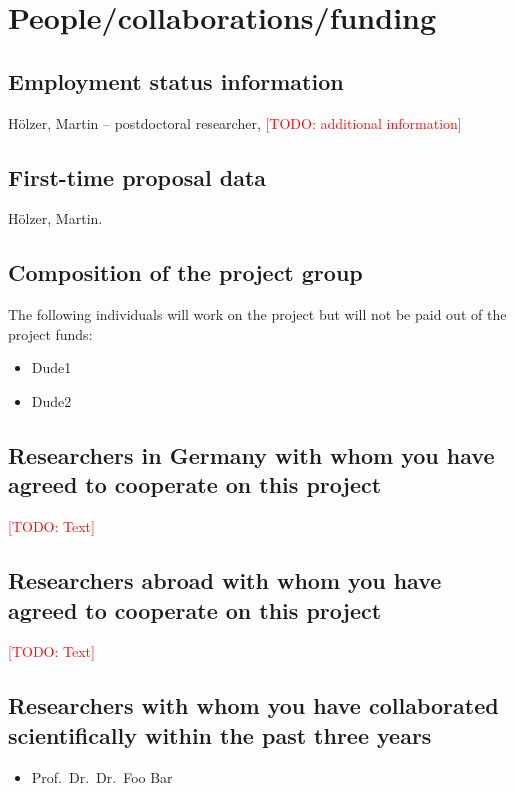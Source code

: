 \documentclass[ngerman,firsttime]{dfgproposal}
\newcommand{\todo}[1]{\xspace{\textcolor{red}{[TODO: #1]}}\xspace}
\begin{document}
	\section{People/collaborations/funding}
	
	\subsection{Employment status information}
	H\"olzer, Martin -- postdoctoral researcher, \todo{additional information}
	
	\subsection{First-time proposal data}
	H\"olzer, Martin.
	
	\subsection{Composition of the project group}
	The following individuals will work on the project but will not be paid out of
	the project funds:
	
	\begin{itemize}
		\item Dude1
		\item Dude2
	\end{itemize}
	
	\subsection{Researchers in Germany with whom you have agreed to cooperate on this project}
	\todo{Text}
	
	\subsection{Researchers abroad with whom you have agreed to cooperate on this project}
	\todo{Text}
	
	\subsection{Researchers with whom you have collaborated scientifically within the past three years}
	\begin{itemize}
		\item Prof.\ Dr.\ Dr.\ Foo Bar
	\end{itemize}
	
\end{document}

